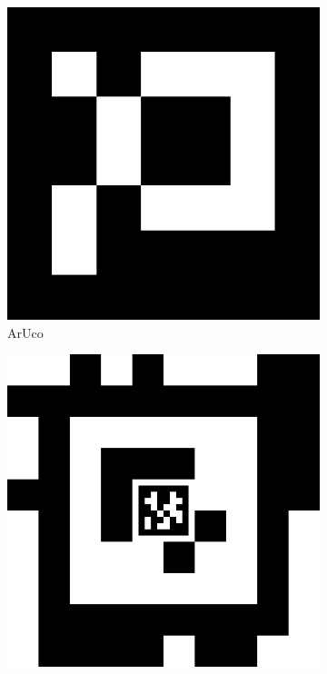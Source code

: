 \begin{figure}
\begin{subfigure}[t]{0.2\textwidth}
          \includegraphics[width=\textwidth]{img/targets/aruco-420.pdf}
          \caption{ArUco}
          \label{fig:ArUco}
        \end{subfigure}
        \hfill
        \begin{subfigure}[t]{0.2\textwidth}
          \includegraphics[width=\textwidth]{img/tag_48_12__36_11_164__137.png}

\end{subfigure}
\end{figure}

